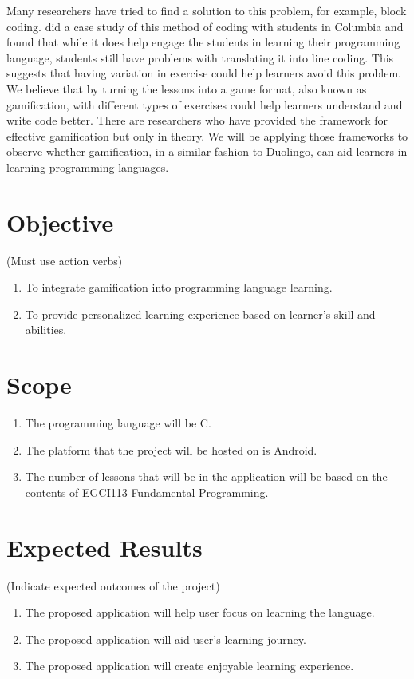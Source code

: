 Many researchers have tried to find a solution to this problem, for example, block coding. \citet{BlockCode} did a case study of this method of coding with students in Columbia and found that while it does help engage the students in learning their programming language, students still have problems with translating it into line coding. This suggests that having variation in exercise could help learners avoid this problem. We believe that by turning the lessons into a game format, also known as gamification, with different types of exercises could help learners understand and write code better. There are researchers who have provided the framework for effective gamification but only in theory. We will be applying those frameworks to observe whether gamification, in a similar fashion to Duolingo, can aid learners in learning programming languages.
\newpage

\section{Objective}
\noindent\hspace{1.5em}(Must use action verbs)
\begin{enumerate}
	\item To integrate gamification into programming language learning.
	\item To provide personalized learning experience based on learner's skill and abilities.
\end{enumerate}

\section{Scope}
\begin{enumerate}
    \item The programming language will be C.
    \item The platform that the project will be hosted on is Android.
    \item The number of lessons that will be in the application will be based on the contents of EGCI113 Fundamental Programming.
\end{enumerate}

\section{Expected Results}
\noindent\hspace{1.5em}(Indicate expected outcomes of the project)
\begin{enumerate}
	\item The proposed application will help user focus on learning the language.
	\item The proposed application will aid user's learning journey.
	\item The proposed application will create enjoyable learning experience.
\end{enumerate}

